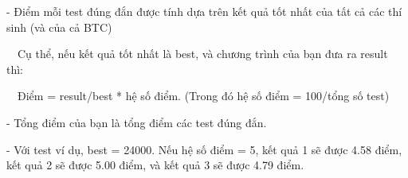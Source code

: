 - Điểm mỗi test đúng đắn được tính dựa trên kết quả tốt nhất của tất cả các thí sinh (và của cả BTC)

  Cụ thể, nếu kết quả tốt nhất là best, và chương trình của bạn đưa ra result thì:

  Điểm = result/best * hệ số điểm. (Trong đó hệ số điểm = 100/tổng số test)

- Tổng điểm của bạn là tổng điểm các test đúng đắn.

- Với test ví dụ, best = 24000. Nếu hệ số điểm = 5, kết quả 1 sẽ được 4.58 điểm, kết quả 2 sẽ được 5.00 điểm, và kết quả 3 sẽ được 4.79 điểm.



 
